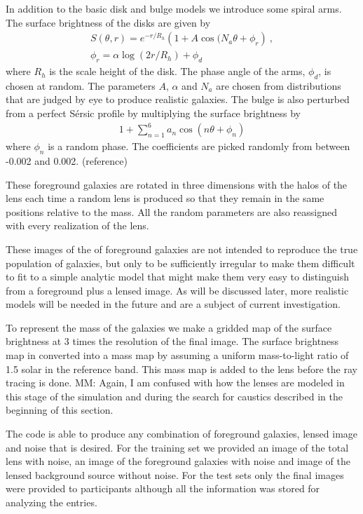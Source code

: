 \documentclass[useAMS,usenatbib]{mnras}
\newcommand{\red}[1]{{\color{red} #1}}
\begin{document}
In addition to the basic disk and bulge models we introduce some spiral arms.  The surface brightness of 
the disks are given by
\begin{align}
S(\theta,r) = e^{-r/R_h} \left( 1 + A \cos(N_a\theta + \phi_r \right) ~, \\
\phi_r = \alpha\log(2 r/ R_h) + \phi_d \nonumber
\end{align}
where $R_h$ is the scale height of the disk.  The phase angle of the arms, $\phi_d$, is chosen at random.  The parameters $A$, $\alpha$ and $N_a$ are chosen from distributions that are judged by eye to produce realistic 
galaxies.
The bulge is also perturbed from a perfect S\'{e}rsic profile by multiplying the surface brightness by
\begin{align}
1+\sum_{n=1}^6 a_n \cos\left( n \theta  + \phi_n \right)
\end{align}
where $\phi_n$ is a random phase.  The coefficients are picked randomly from between -0.002 and 0.002. \red{(reference)}

These foreground galaxies are rotated in three dimensions with the halos of the lens each time a random lens is produced so that they remain in the same positions relative to the mass.  All the random parameters are also reassigned with every realization of the lens.

These images of the of foreground galaxies are not intended to reproduce the true population of galaxies, but only to be sufficiently irregular to make them difficult to fit to a simple analytic model that might make them very easy to distinguish from a foreground plus a lensed image.   As will be discussed later, more realistic models will be needed in the future and are a subject of current investigation.

To represent the mass of the galaxies we make a gridded map of the surface brightness at 3 times the resolution of the final image.  The surface brightness map in converted into a mass map by assuming a uniform mass-to-light ratio of 1.5 solar in the reference band.  This mass map is added to the lens before the ray tracing is done. {\color{red} MM: Again, I am confused with how the lenses are modeled in this stage of the simulation and during the search for caustics described in the beginning of this section.}

The code is able to produce any combination of foreground galaxies, lensed image and noise that is desired.  For the training set we provided an image of the total lens with noise, an image of the foreground galaxies with noise and image of the lensed background source without noise.
For the test sets only the final images were provided to participants although all the information was stored for analyzing the entries.
\end{document}
